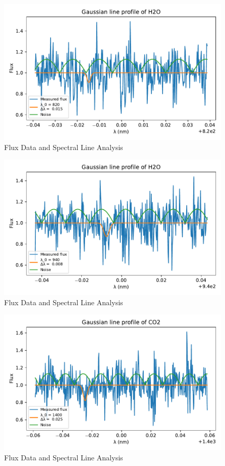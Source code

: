 \documentclass[reprint,english,notitlepage]{revtex4-2}
\begin{document}
\begin{figure}[h!]
  \centering
  \includegraphics[scale =.5]{Figures/H2O 820.pdf}
  \caption{Flux Data and Spectral Line Analysis}
  \label{fig: H2 820}
\end{figure}

\begin{figure}[h!]
  \centering
  \includegraphics[scale =.5]{Figures/H2O 940.pdf}
  \caption{Flux Data and Spectral Line Analysis}
  \label{fig: H2 940}
\end{figure}

\begin{figure}[h!]
  \centering
  \includegraphics[scale =.5]{Figures/CO2 1400.pdf}
  \caption{Flux Data and Spectral Line Analysis}
  \label{fig: CO2 1400}
\end{figure}
\end{document}
